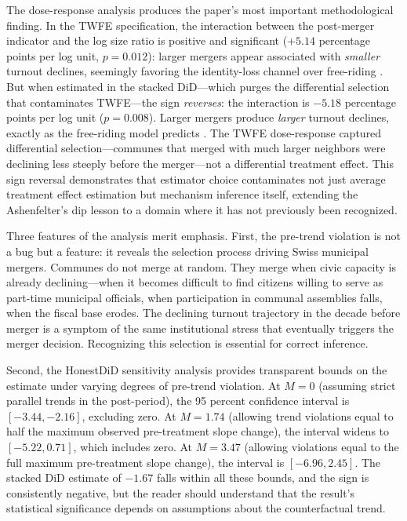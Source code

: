 \documentclass[12pt]{article}
\begin{document}
The dose-response analysis produces the paper's most important methodological finding. In the TWFE specification, the interaction between the post-merger indicator and the log size ratio is positive and significant ($+5.14$ percentage points per log unit, $p = 0.012$): larger mergers appear associated with \textit{smaller} turnout declines, seemingly favoring the identity-loss channel over free-riding \citep{putnam1993making}. But when estimated in the stacked DiD---which purges the differential selection that contaminates TWFE---the sign \textit{reverses}: the interaction is $-5.18$ percentage points per log unit ($p = 0.008$). Larger mergers produce \textit{larger} turnout declines, exactly as the free-riding model predicts \citep{olson1965logic}. The TWFE dose-response captured differential selection---communes that merged with much larger neighbors were declining less steeply before the merger---not a differential treatment effect. This sign reversal demonstrates that estimator choice contaminates not just average treatment effect estimation but mechanism inference itself, extending the Ashenfelter's dip lesson to a domain where it has not previously been recognized.

Three features of the analysis merit emphasis. First, the pre-trend violation is not a bug but a feature: it reveals the selection process driving Swiss municipal mergers. Communes do not merge at random. They merge when civic capacity is already declining---when it becomes difficult to find citizens willing to serve as part-time municipal officials, when participation in communal assemblies falls, when the fiscal base erodes. The declining turnout trajectory in the decade before merger is a symptom of the same institutional stress that eventually triggers the merger decision. Recognizing this selection is essential for correct inference.

Second, the HonestDiD sensitivity analysis \citep{rambachan2023more} provides transparent bounds on the estimate under varying degrees of pre-trend violation. At $M = 0$ (assuming strict parallel trends in the post-period), the 95 percent confidence interval is $[-3.44, -2.16]$, excluding zero. At $M = 1.74$ (allowing trend violations equal to half the maximum observed pre-treatment slope change), the interval widens to $[-5.22, 0.71]$, which includes zero. At $M = 3.47$ (allowing violations equal to the full maximum pre-treatment slope change), the interval is $[-6.96, 2.45]$. The stacked DiD estimate of $-1.67$ falls within all these bounds, and the sign is consistently negative, but the reader should understand that the result's statistical significance depends on assumptions about the counterfactual trend.
\end{document}
